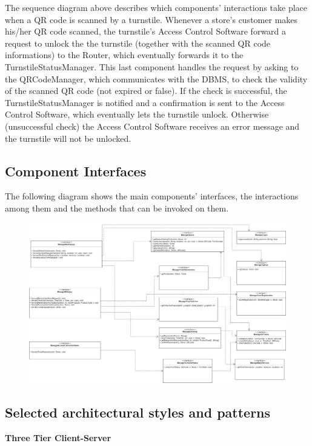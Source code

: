 \documentclass{article}
\begin{document}
\noindent The sequence diagram above describes which components’ interactions take place when a QR code is scanned by a turnstile. Whenever a store’s customer makes his/her QR code scanned, the turnstile’s Access Control Software forward a request to unlock the the turnstile (together with the scanned QR code informations) to the Router, which eventually forwards it to the TurnstileStatusManager. This last component handles the request by asking to the QRCodeManager, which communicates with the DBMS, to check the validity of the scanned QR code (not expired or false). If the check is successful, the TurnstileStatusManager is notified and a confirmation is sent to the Access Control Software, which eventually lets the turnstile unlock. Otherwise (unsuccessful check) the Access Control Software receives an error message and the turnstile will not be unlocked.
\subsection{Component Interfaces}
The following diagram shows the main components' interfaces, the interactions among them and the methods that can be invoked on them.
\begin{figure}[H]
  \includegraphics[width=\linewidth]{interfacesDiagram.png}
  
\end{figure}

\subsection{Selected architectural styles and patterns}

\noindent\textbf{Three Tier Client-Server}\\
\end{document}
